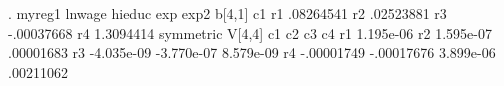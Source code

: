. myreg1 lnwage hieduc exp exp2 
{\smallskip}
b[4,1]
            c1
r1   .08264541
r2   .02523881
r3  -.00037668
r4   1.3094414
{\smallskip}
symmetric V[4,4]
            c1          c2          c3          c4
r1   1.195e-06
r2   1.595e-07   .00001683
r3  -4.035e-09  -3.770e-07   8.579e-09
r4  -.00001749  -.00017676   3.899e-06   .00211062
{\smallskip}
